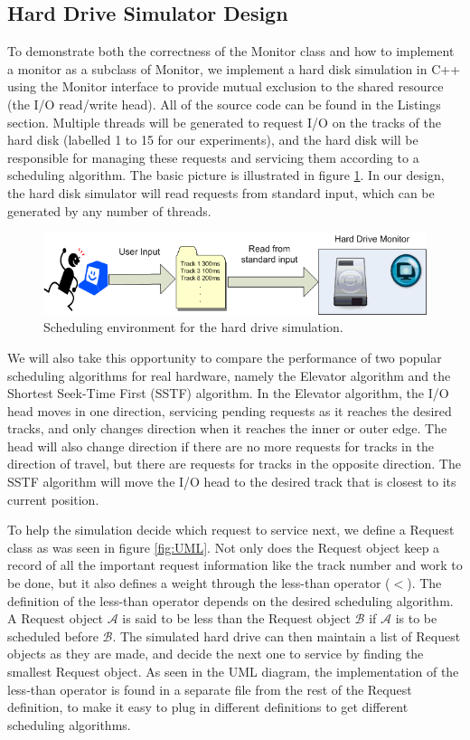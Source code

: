 \documentclass{report}
\begin{document}
\subsection{Hard Drive Simulator Design}
To demonstrate both the correctness of the Monitor class and how to implement a monitor as
a subclass of Monitor, we implement a hard disk simulation in C++ using the Monitor
interface to provide mutual exclusion to the shared resource (the I/O read/write head).
All of the source code can be found in the Listings section.
Multiple threads will be generated to request I/O on the tracks of the hard disk (labelled
1 to 15 for our experiments), and the hard disk will be responsible for managing these
requests and servicing them according to a scheduling algorithm. The basic picture is
illustrated in figure \ref{fig:sched}. In our design, the hard disk simulator will read
requests from standard input, which can be generated by any number of threads.
\begin{figure}[htb!]
    \centering
    \includegraphics[scale=0.6]{Scheduling_Env.png}
    \caption{Scheduling environment for the hard drive simulation.}
    \label{fig:sched}
\end{figure}

We will also take this opportunity to compare the performance of two popular scheduling
algorithms for real hardware, namely the Elevator algorithm and the Shortest Seek-Time
First (SSTF) algorithm. In the Elevator algorithm, the I/O head moves in one direction,
servicing pending requests as it reaches the desired tracks, and only changes direction
when it reaches the inner or outer edge. The head will also change direction if there are 
no more requests for tracks in the direction of travel, but there are requests for tracks
in the opposite direction. The SSTF algorithm will move the I/O head to the desired
track that is closest to its current position.

To help the simulation decide which request to service next, we define a Request class as
was seen in figure \ref{fig:UML}. Not only does the Request object keep a record of all
the important request information like the track number and work to be done, but it also
defines a weight through the less-than operator ($<$). The definition of the less-than
operator depends on the desired scheduling algorithm. A Request object $\mathcal{A}$ is said to be
less than the Request object $\mathcal{B}$ if $\mathcal{A}$ is to be scheduled before
$\mathcal{B}$. The simulated hard drive can then maintain a list of
Request objects as they are made, and decide the next one to service by finding the
smallest Request object. As seen in the UML diagram, the implementation of the less-than
operator is found in a separate file from the rest of the Request definition, to make it
easy to plug in different definitions to get different scheduling algorithms.
\end{document}
